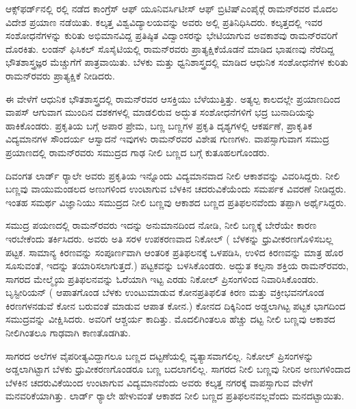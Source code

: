 
ಆಕ್ಸ್‌ಫರ್ಡ್‌ನಲ್ಲಿ ರಲ್ಲಿ ನಡೆದ ಕಾಂಗ್ರೆಸ್ ಆಫ್ ಯೂನಿವರ್ಸಿಟೀಸ್ ಆಫ್ ಬ್ರಿಟಿಷ್\break ಎಂಪೈರ್‍ಗೆ ರಾಮನ್‍ರವರ ಮೊದಲ ವಿದೇಶ ಪ್ರಯಾಣ ನಡೆಯಿತು. ಕಲ್ಕತ್ತ ವಿಶ್ವವಿದ್ಯಾಲಯವನ್ನು ಅವರು ಅಲ್ಲಿ ಪ್ರತಿನಿಧಿಸಿದರು. ಕಲ್ಕತ್ತದಲ್ಲಿ ಇವರ ಸಂಶೋಧನೆಗಳನ್ನು ಕುರಿತು ಅಭಿಮಾನವಿದ್ದ ಪ್ರತಿಷ್ಠಿತ ವಿದ್ವಾಂಸರನ್ನು ಭೇಟಿಯಾಗುವ ಅವಕಾಶವು ರಾಮನ್‍ರವರಿಗೆ ದೊರಕಿತು. ಲಂಡನ್ ಫಿಸಿಕಲ್ ಸೊಸೈಟಿಯಲ್ಲಿ ರಾಮನ್‍ರವರು ಪ್ರಾತ್ಯಕ್ಷಿಕೆಯೊಡನೆ ಮಾಡಿದ ಭಾಷಣವು ನೆರೆದಿದ್ದ ಭೌತಶಾಸ್ತ್ರಜ್ಞರ ಮೆಚ್ಚುಗೆಗೆ ಪಾತ್ರವಾಯಿತು. ಬೆಳಕು ಮತ್ತು ಧ್ವನಿಶಾಸ್ತ್ರದಲ್ಲಿ ಮಾಡಿದ ಆಧುನಿಕ ಸಂಶೋ\-ಧನೆಗಳ ಕುರಿತು ರಾಮನ್‍ರವರು ಪ್ರಾತ್ಯಕ್ಷಿಕೆ ನೀಡಿದರು.

ಈ ವೇಳೆಗೆ ಆಧುನಿಕ ಭೌತಶಾಸ್ತ್ರದಲ್ಲಿ ರಾಮನ್‍ರವರ ಆಸಕ್ತಿಯು ಬೆಳೆಯುತ್ತಿತ್ತು. ಅತ್ಯಲ್ಪ ಕಾಲದಲ್ಲೇ ಪ್ರಯಾಣದಿಂದ ವಾಪಸ್ ಆಗುವಾಗ ಮುಂದಿನ ದಶಕಗಳಲ್ಲಿ ಮಾಡಲಿರುವ ಅದ್ಭುತ ಸಂಶೋಧನೆಗಳಿಗೆ ಭದ್ರ ಬುನಾದಿಯನ್ನು ಹಾಕಿಕೊಂಡರು. ಪ್ರಕೃತಿಯ ಬಗ್ಗೆ ಅಪಾರ ಪ್ರೇಮ, ಬಣ್ಣ ಬಣ್ಣಗಳ ಪ್ರಕೃತಿ ದೃಶ್ಯಗಳಲ್ಲಿ ಆಕರ್ಷಣೆ, ಪ್ರಾಕೃತಿಕ ವಿದ್ಯಮಾನಗಳ ಸೌಂದರ್ಯ ಆಸ್ವಾದನೆ \enginline{-} ಇವುಗಳು ರಾಮನ್‍ರವರ ವಿಶೇಷ ಗುಣಗಳು. ವಾಪಸ್ಸಾಗುವಾಗ ಸಮುದ್ರ ಪ್ರಯಾಣದಲ್ಲಿ ರಾಮನ್‍ರವರು ಸಮುದ್ರದ ಗಾಢ ನೀಲಿ ಬಣ್ಣದ ಬಗ್ಗೆ ಕುತೂಹಲಗೊಂಡರು.

ದಿವಂಗತ ಲಾರ್ಡ್ ರ‍್ಯಾಲೇ ಅವರು ಪ್ರಕೃತಿಯ ಇನ್ನೊಂದು ವಿದ್ಯಮಾನವಾದ ನೀಲಿ ಆಕಾಶವನ್ನು ವಿವರಿಸಿದ್ದರು. ನೀಲಿ ಬಣ್ಣವು ವಾಯುಮಂಡಲದ ಅಣುಗಳಿಂದ ಉಂಟಾಗುವ ಬೆಳಕಿನ ಚದರುವಿಕೆಯೆಂದು ಸಮರ್ಪಕ ವಿವರಣೆ ನೀಡಿದ್ದರು. ಇಂತಹ ಸಮರ್ಥ ವಿಜ್ಞಾನಿಯು ಸಮುದ್ರದ ನೀಲಿ ಬಣ್ಣವು ಆಕಾಶದ ಬಣ್ಣದ ಪ್ರತಿಫಲನವೆಂದು ತಪ್ಪಾಗಿ ಅರ್ಥೈಸಿದ್ದರು.

ಸಮುದ್ರ ಪಯಣದಲ್ಲಿ ರಾಮನ್‍ರವರು ಇದನ್ನು ಅನುಮಾನದಿಂದ ನೋಡಿ, ನೀಲಿ ಬಣ್ಣಕ್ಕೆ ಬೇರೆಯೇ ಕಾರಣ ಇರಬೇಕೆಂದು ತರ್ಕಿಸಿದರು. ಅವರು ಅತಿ ಸರಳ ಉಪಕರಣವಾದ ನಿಕೋಲ್ ( ಬೆಳಕನ್ನು ಧ್ರುವೀಕರಣಗೊಳಿಸಬಲ್ಲ ಪಟ್ಟಕ. ಸಾಮಾನ್ಯ ಕಿರಣವನ್ನು ಸಂಪೂರ್ಣವಾಗಿ ಆಂತರಿಕ ಪ್ರತಿಫಲನಕ್ಕೆ ಒಳಪಡಿಸಿ, ಉಳಿದ ಕಿರಣವನ್ನು ಮಾತ್ರ ಹೊರ ಸೂಸುವಂತೆ, ಇದನ್ನು ತಯಾರಿಸಲಾಗುತ್ತದೆ.) ಪಟ್ಟಕವನ್ನು ಬಳಸಿಕೊಂಡರು. ಅದ್ಭುತ ಕಲ್ಪನಾ ಶಕ್ತಿಯ ರಾಮನ್‍ರವರು, ಸಾಗರದ ಮೇಲ್ಮೈಯ ಪ್ರತಿಫಲನವನ್ನು ಓರೆಯಾಗಿ ಇಟ್ಟ ಎರಡು ನಿಕೋಲ್ ಪ್ರಿಸಂಗಳಿಂದ ನಿವಾರಿಸಿಕೊಂಡರು. ಬೃಸ್ಟೀರಿಯನ್ ( ಆಪಾತಗೊಂಡ ಬೆಳಕು ಉಂಟುಮಾಡುವ ಕೋನ\enginline{-}ಪ್ರತಿಫಲಿತ ಕಿರಣ ಮತ್ತು ವಕ್ರೀಭವನಗೊಂಡ ಕಿರಣಗಳನಡುವೆ ಕೋನ ಬರುವಂತೆ ಮಾಡುವ ಆಪಾತ ಕೋನ.) ಕೋನದ ದಿಕ್ಕಿನಿಂದ ಅಡ್ಡಲಾಗಿಟ್ಟ ಪಟ್ಟಕ ಭಾಗದಿಂದ ಸಮುದ್ರವನ್ನು ವೀಕ್ಷಿಸಿದರು. ಅವರಿಗೆ ಆಶ್ಚರ್ಯ ಕಾದಿತ್ತು. ಮೊದಲಿಗಿಂತಲೂ ಹೆಚ್ಚು ದಟ್ಟ ನೀಲಿ ಬಣ್ಣವು ಆಕಾಶದ ನೀಲಿಗಿಂತಲೂ ಗಾಢವಾಗಿ ಕಾಣತೊಡಗಿತು. 

ಸಾಗರದ ಅಲೆಗಳ ವೈಪರೀತ್ಯವಿದ್ದಾಗಲೂ ಬಣ್ಣದ ದಟ್ಟಣೆಯಲ್ಲಿ ವ್ಯತ್ಯಾಸವಾಗಲಿಲ್ಲ. ನಿಕೋಲ್ ಪ್ರಿಸಂಗಳನ್ನು ಅಡ್ಡಲಾಗಿಟ್ಟಾಗ ಬೆಳಕು ಧ್ರುವೀಕರಣಗೊಂಡರೂ ಬಣ್ಣ ಬದಲಾಗಲಿಲ್ಲ. ಸಾಗರದ ನೀಲಿ ಬಣ್ಣವು ನೀರಿನ ಅಣುಗಳಿಂದಾದ ಬೆಳಕಿನ ಚದರುವಿಕೆಯಿಂದ ಉಂಟಾಗುವ ವಿದ್ಯಮಾನವೆಂದು ಅವರು ಕಲ್ಕತ್ತ ನಗರಕ್ಕೆ ವಾಪಸ್ಸಾಗುವ ವೇಳೆಗೆ ಮನವರಿಕೆಯಾಗಿತ್ತು. ಲಾರ್ಡ್ ರ‍್ಯಾಲೇ ಹೇಳುವಂತೆ ಆಕಾಶದ ನೀಲಿ ಬಣ್ಣದ ಪ್ರತಿಫಲನವಲ್ಲವೆಂದು ಮನದಟ್ಟಾಯಿತು.

